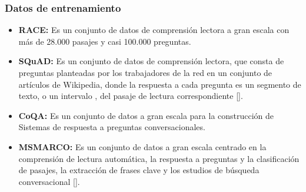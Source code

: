 \documentclass[../Main.tex]{subfiles}
\begin{document}
    \subsubsection{Datos de entrenamiento}
    \begin{itemize}
        \item \textbf{RACE:} Es un conjunto de datos de comprensión lectora a gran escala con más de 28.000 pasajes y casi 100.000 preguntas.

        \item \textbf{SQuAD:} Es un conjunto de datos de comprensión lectora, que consta de preguntas planteadas por los trabajadores de la red en un conjunto de artículos de Wikipedia, donde la respuesta a cada pregunta es un segmento de texto, o un intervalo , del pasaje de lectura correspondiente []. %
        
        \item \textbf{CoQA:} Es un conjunto de datos a gran escala para la construcción de Sistemas de respuesta a preguntas conversacionales. 
        
        \item \textbf{MSMARCO:} Es un conjunto de datos a gran escala centrado en la comprensión de lectura automática, la respuesta a preguntas y la clasificación de pasajes, la extracción de frases clave y los estudios de búsqueda conversacional []. %
    \end{itemize}
\end{document}
